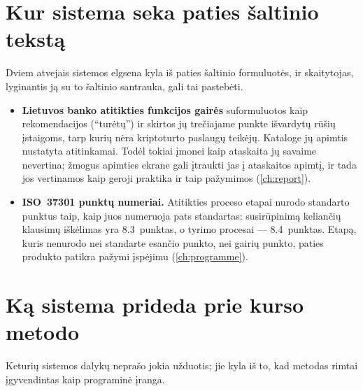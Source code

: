 \section{Kur sistema seka paties šaltinio tekstą}\label{sec:course:sources}

Dviem atvejais sistemos elgsena kyla iš paties šaltinio formuluotės, ir skaitytojas, lyginantis
ją su to šaltinio santrauka, gali tai pastebėti.

\begin{itemize}
  \item \textbf{Lietuvos banko atitikties funkcijos gairės} suformuluotos kaip rekomendacijos
    (\enquote{turėtų}) ir skirtos jų trečiajame punkte išvardytų rūšių įstaigoms, tarp kurių
    nėra kriptoturto paslaugų teikėjų. Kataloge jų apimtis nustatyta atitinkamai. Todėl tokiai
    įmonei kaip \demo{} ataskaita jų savaime nevertina; žmogus apimties ekrane gali įtraukti
    jas į ataskaitos apimtį, ir tada jos vertinamos kaip geroji praktika ir taip pažymimos
    (\cref{ch:report}).
  \item \textbf{ISO~37301 punktų numeriai.} Atitikties proceso etapai nurodo standarto punktus
    taip, kaip juos numeruoja pats standartas: susirūpinimą keliančių klausimų iškėlimas yra
    8.3~punktas, o tyrimo procesai --- 8.4~punktas. Etapą, kuris nenurodo nei standarte
    esančio punkto, nei gairių punkto, paties produkto patikra pažymi įspėjimu
    (\cref{ch:programme}).
\end{itemize}

\section{Ką sistema prideda prie kurso metodo}\label{sec:course:adds}

Keturių sistemos dalykų neprašo jokia užduotis; jie kyla iš to, kad metodas rimtai įgyvendintas
kaip programinė įranga.


